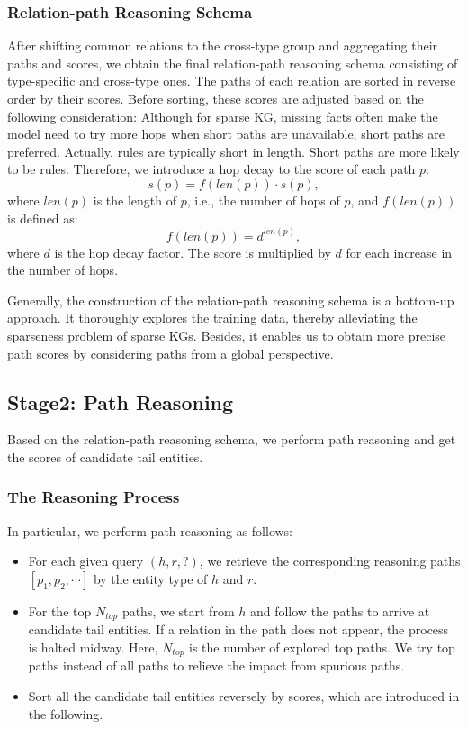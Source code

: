 \documentclass[sigconf]{acmart}
\begin{document}
\subsubsection{Relation-path Reasoning Schema}
After shifting common relations to the cross-type group and aggregating their paths and scores, we obtain the final relation-path reasoning schema consisting of type-specific and cross-type ones. The paths of each relation are sorted in reverse order by their scores. Before sorting, these scores are adjusted based on the following consideration: Although for sparse KG, missing facts often make the model need to try more hops when short paths are unavailable, short paths are preferred. Actually, rules are typically short in length. Short paths are more likely to be rules. Therefore, we introduce a hop decay to the score of each path $p$:
\begin{equation}
	s(p) = f(len(p)) \cdot s(p),
	\label{eq:path_score}
\end{equation}
where $len(p)$ is the length of $p$, i.e., the number of hops of $p$, and $f(len(p))$ is defined as:
\begin{equation}
	f(len(p)) = d^{len(p)},
\end{equation}
where $d$ is the hop decay factor. The score is multiplied by $d$ for each increase in the number of hops.

Generally, the construction of the relation-path reasoning schema is a bottom-up approach. It thoroughly explores the training data, thereby alleviating the sparseness problem of sparse KGs. Besides, it enables us to obtain more precise path scores by considering paths from a global perspective.

\subsection{Stage2: Path Reasoning}
Based on the relation-path reasoning schema, we perform path reasoning and get the scores of candidate tail entities.

\subsubsection{The Reasoning Process}
In particular, we perform path reasoning as follows:
\begin{itemize}
	\item For each given query $(h,r,?)$, we retrieve the corresponding reasoning paths $[p_1, p_2, \cdots]$ by the entity type of $h$ and $r$.
	\item For the top $N_{top}$ paths, we start from $h$ and follow the paths to arrive at candidate tail entities. If a relation in the path does not appear, the process is halted midway. Here, $N_{top}$ is the number of explored top paths. We try top paths instead of all paths to relieve the impact from spurious paths.
	\item Sort all the candidate tail entities reversely by scores, which are introduced in the following.
\end{itemize}
\end{document}
